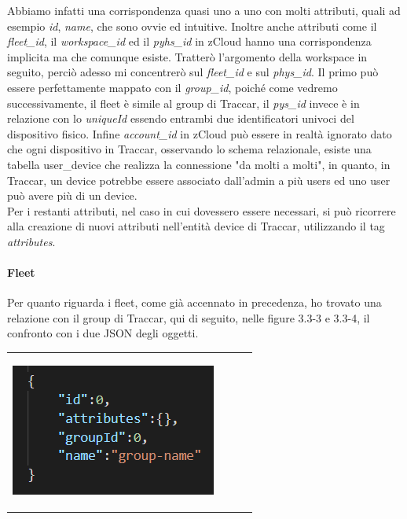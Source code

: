 \documentclass[a4paper,titlepage,12pt]{report}
\begin{document}
{Abbiamo infatti una corrispondenza quasi uno a uno con molti attributi, quali ad esempio \textit{id}, \textit{name}, che sono ovvie ed intuitive. Inoltre anche attributi come il \textit{fleet\_id}, il \textit{workspace\_id} ed il \textit{pyhs\_id} in zCloud hanno una corrispondenza implicita ma che comunque esiste. Tratterò l'argomento della workspace in seguito,  perciò adesso mi concentrerò sul \textit{fleet\_id} e sul \textit{phys\_id}. Il primo può essere perfettamente mappato con il \textit{group\_id}, poiché come vedremo successivamente, il fleet è simile al group di Traccar, il \textit{pys\_id} invece è in relazione con lo \textit{uniqueId} essendo entrambi due identificatori univoci del dispositivo fisico. Infine \textit{account\_id} in zCloud può essere in realtà ignorato dato che ogni dispositivo in Traccar, osservando lo schema relazionale, esiste una tabella user\_device che realizza la connessione "da molti a molti", in quanto, in Traccar, un device potrebbe essere associato dall'admin a più users ed uno user può avere più di un device.\\
Per i restanti attributi, nel caso in cui dovessero essere necessari, si può ricorrere alla creazione di nuovi attributi nell'entità device di Traccar, utilizzando il tag \textit{attributes}.

\paragraph{
Fleet}
Per quanto riguarda i fleet, come già accennato in precedenza, ho trovato una relazione con il group di Traccar, qui di seguito, nelle figure 3.3-3 e 3.3-4, il confronto con i due JSON degli oggetti.




\begin{center}

\begin{tabular}{c c c c}

    \includegraphics[scale=0.8]{images/traccGr.png}

    \label{fig:my_label}


\end{tabular}
\end{center}}
\end{document}
